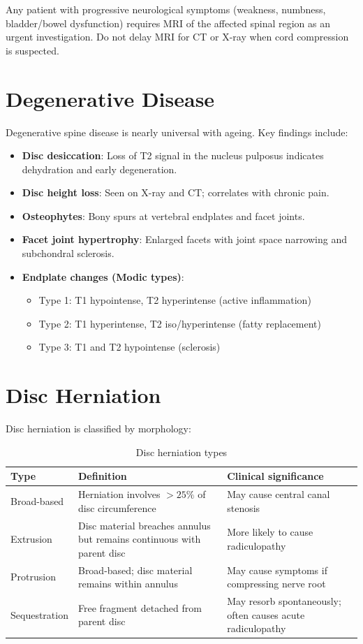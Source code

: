\begin{pearlbox}
Any patient with progressive neurological symptoms (weakness, numbness, bladder/bowel dysfunction) requires MRI of the affected spinal region as an urgent investigation. Do not delay MRI for CT or X-ray when cord compression is suspected.
\end{pearlbox}


\section{Degenerative Disease}
Degenerative spine disease is nearly universal with ageing. Key findings include:

\begin{itemize}
  \item \textbf{Disc desiccation}: Loss of T2 signal in the nucleus pulposus indicates dehydration and early degeneration.
  \item \textbf{Disc height loss}: Seen on X-ray and CT; correlates with chronic pain.
  \item \textbf{Osteophytes}: Bony spurs at vertebral endplates and facet joints.
  \item \textbf{Facet joint hypertrophy}: Enlarged facets with joint space narrowing and subchondral sclerosis.
  \item \textbf{Endplate changes (Modic types)}:
    \begin{itemize}
      \item Type 1: T1 hypointense, T2 hyperintense (active inflammation)
      \item Type 2: T1 hyperintense, T2 iso/hyperintense (fatty replacement)
      \item Type 3: T1 and T2 hypointense (sclerosis)
    \end{itemize}
\end{itemize}


\section{Disc Herniation}
Disc herniation is classified by morphology:

\begin{table}[h]
\centering
\caption{Disc herniation types}
\begin{tabular}{p{3cm} p{4.5cm} p{4.5cm}}
\hline
\textbf{Type} & \textbf{Definition} & \textbf{Clinical significance} \\
\hline
Broad-based & Herniation involves $> 25\%$ of disc circumference & May cause central canal stenosis \\
Extrusion & Disc material breaches annulus but remains continuous with parent disc & More likely to cause radiculopathy \\
Protrusion & Broad-based; disc material remains within annulus & May cause symptoms if compressing nerve root \\
Sequestration & Free fragment detached from parent disc & May resorb spontaneously; often causes acute radiculopathy \\
\hline
\end{tabular}
\end{table}

